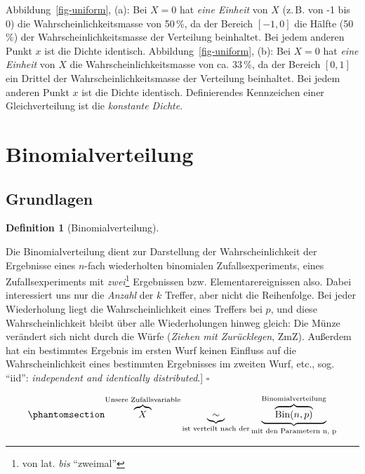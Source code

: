 \documentclass[
  ngerman,
  letterpaper,
  twoside,
  open=any]{scrbook}
\theoremstyle{definition}
\theoremstyle{plain}
\theoremstyle{definition}
\theoremstyle{definition}
\newtheorem{definition}{Definition}[chapter]
\theoremstyle{definition}
\theoremstyle{definition}
\theoremstyle{remark}
\begin{document}
Abbildung~\ref{fig-uniform}, (a): Bei \(X=0\) hat \emph{eine Einheit}
von \(X\) (z.\,B. von -1 bis 0) die Wahrscheinlichkeitsmasse von 50\,\%,
da der Bereich \([-1, 0]\) die Hälfte (50\,\%) der
Wahrscheinlichkeitsmasse der Verteilung beinhaltet. Bei jedem anderen
Punkt \(x\) ist die Dichte identisch. Abbildung~\ref{fig-uniform}, (b):
Bei \(X=0\) hat \emph{eine Einheit} von \(X\) die
Wahrscheinlichkeitsmasse von ca. 33\,\%, da der Bereich \([0, 1]\) ein
Drittel der Wahrscheinlichkeitsmasse der Verteilung beinhaltet. Bei
jedem anderen Punkt \(x\) ist die Dichte identisch. Definierendes
Kennzeichen einer Gleichverteilung ist die \emph{konstante Dichte}.

\section{Binomialverteilung}\label{sec-bin-distrib}

\subsection{Grundlagen}\label{grundlagen-4}

\begin{definition}[Binomialverteilung]\protect\hypertarget{def-binvert}{}\label{def-binvert}

Die Binomialverteilung dient zur Darstellung der Wahrscheinlichkeit der
Ergebnisse eines \(n\)-fach wiederholten binomialen Zufallsexperiments,
eines Zufallsexperiments mit \emph{zwei}\footnote{von lat. \emph{bis}
  \enquote{zweimal}} Ergebnissen bzw. Elementarereignissen also. Dabei
interessiert uns nur die \emph{Anzahl} der \(k\) Treffer, aber nicht die
Reihenfolge. Bei jeder Wiederholung liegt die Wahrscheinlichkeit eines
Treffers bei \(p\), und diese Wahrscheinlichkeit bleibt über alle
Wiederholungen hinweg gleich: Die Münze verändert sich nicht durch die
Würfe (\emph{Ziehen mit Zurücklegen}, ZmZ). Außerdem hat ein bestimmtes
Ergebnis im ersten Wurf keinen Einfluss auf die Wahrscheinlichkeit eines
bestimmten Ergebnisses im zweiten Wurf, etc., sog. \enquote{iid}:
\emph{independent and identically distributed}.{]} \(\square\)

\end{definition}

\begin{equation}\protect\phantomsection\label{eq-binvert}{\overbrace{X}^{\text{Unsere Zufallsvariable}} \underbrace{\sim}_{\text{ist verteilt nach der}} \underbrace{\overbrace{\text{Bin}(n, p)}^{\text{Binomialverteilung}}}_{\text{mit den Parametern n, p}}}\end{equation}
\end{document}
